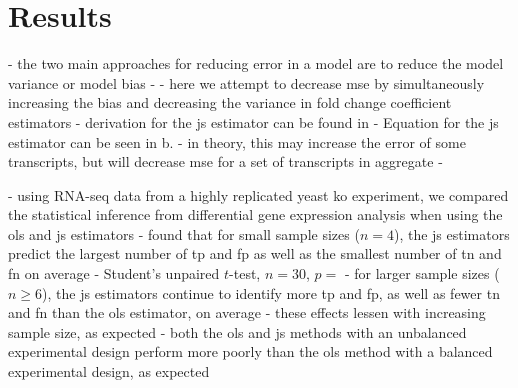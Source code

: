 \section{Results}

- the two main approaches for reducing error in a model are to reduce the model variance or model bias
  - 
- here we attempt to decrease \gls{mse} by simultaneously increasing the bias and decreasing the variance in fold change coefficient estimators
- derivation for the \gls{js} estimator can be found in 
  - Equation for the \gls{js} estimator can be seen in b. 
- in theory, this may increase the error of some transcripts, but will decrease \gls{mse} for a set of transcripts in aggregate
  - 


- using RNA-seq data from a highly replicated yeast \gls{ko} experiment, we compared the statistical inference from differential gene expression analysis when using the \gls{ols} and \gls{js} estimators
- found that for small sample sizes ($n = 4$), the \gls{js} estimators predict the largest number of \gls{tp} and \gls{fp} as well as the smallest number of \gls{tn} and \gls{fn} on average
  - Student's unpaired $t$-test, $n = 30$, $p = $
- for larger sample sizes ($n \ge 6$), the \gls{js} estimators continue to identify more \gls{tp} and \gls{fp}, as well as fewer \gls{tn} and \gls{fn} than the \gls{ols} estimator, on average
  - these effects lessen with increasing sample size, as expected
- both the \gls{ols} and \gls{js} methods with an unbalanced experimental design perform more poorly than the \gls{ols} method with a balanced experimental design, as expected

